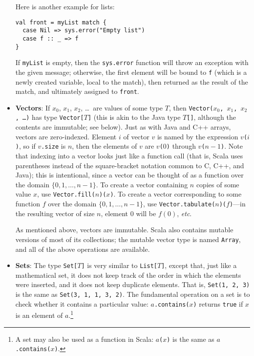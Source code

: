 \begin{itemize}
Here is another example for lists:
\begin{verbatim}
val front = myList match {
  case Nil => sys.error("Empty list")
  case f :: _ => f
}
\end{verbatim}
If \texttt{myList} is empty, then the \texttt{sys.error} function will throw an exception with the given message; otherwise, the first element will be bound to \texttt{f} (which is a newly created variable, local to the match), then returned as the result of the match, and ultimately assigned to \texttt{front}.

\item \textbf{Vectors}: If $x_0$, $x_1$, $x_2$, \ldots\ are values of some type $T$, then \texttt{Vector($x_0$, $x_1$, $x_2$, \ldots)} has type \texttt{Vector[$T$]} (this is akin to the Java type $T$\verb|[]|, although the contents are immutable; see below). Just as with Java and C++ arrays, vectors are zero-indexed. Element $i$ of vector $v$ is named by the expression \texttt{$v$($i$)}, so if \texttt{$v$.size} is $n$, then the elements of $v$ are \texttt{$v$($0$)} through \texttt{$v$($n-1$)}. Note that indexing into a vector looks just like a function call (that is, Scala uses parentheses instead of the  square-bracket notation common to C, C++, and Java); this is intentional, since a vector can be thought of as a function over the domain $\{0, 1, \ldots, n-1\}$. To create a vector containing $n$ copies of some value $x$, use \texttt{Vector.fill($n$)($x$)}. To create a vector corresponding to some function $f$ over the domain $\{0, 1, \ldots, n-1\}$, use \texttt{Vector.tabulate($n$)($f$)}---in the resulting vector of size $n$, element $0$ will be $f(0)$, \textit{etc}.

As mentioned above, vectors are immutable. Scala also contains mutable versions of most of its collections; the mutable vector type is named \verb|Array|, and all of the above operations are available.

\item \textbf{Sets}: The type \texttt{Set[$T$]} is very similar to \texttt{List[$T$]}, except that, just like a mathematical set, it does not keep track of the order in which the elements were inserted, and it does not keep duplicate elements. That is, \texttt{Set(1, 2, 3)} is the same as \texttt{Set(3, 1, 1, 3, 2)}. The fundamental operation on a set is to check whether it contains a particular value: \texttt{$a$.contains($x$)} returns \texttt{true} if $x$ is an element of $a$.\footnote{A set may also be used as a function in Scala: \texttt{$a$($x$)} is the same as \texttt{$a$.contains($x$)}.}


\end{itemize}
